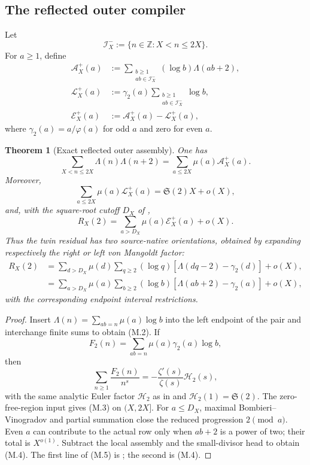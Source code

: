 \documentclass[11pt]{article}
\newtheorem{theorem}{Theorem}[section]
\theoremstyle{definition}
\theoremstyle{remark}
\newcommand{\Z}{\mathbb Z}
\begin{document}
\subsection{The reflected outer compiler}

Let
\[
 \mathscr I_X^-:=\{n\in\Z:X<n\le2X\}.
\]
For $a\ge1$, define
\[
 \begin{aligned}
 \mathcal A_X^+(a)
 &:=\sum_{\substack{b\ge1\\ab\in\mathscr I_X^-}}
       (\log b)\Lambda(ab+2),\\
 \mathcal L_X^+(a)
 &:=\gamma_2(a)
     \sum_{\substack{b\ge1\\ab\in\mathscr I_X^-}}\log b,\\
 \mathcal E_X^+(a)
 &:=\mathcal A_X^+(a)-\mathcal L_X^+(a),
 \end{aligned}
 \tag{M.1}
\]
where $\gamma_2(a)=a/\varphi(a)$ for odd $a$ and zero for even $a$.

\begin{theorem}[Exact reflected outer assembly]
\label{thm:hard-reflected-assembly}
One has
\[
 \boxed{
 \sum_{X<n\le2X}\Lambda(n)\Lambda(n+2)
 =\sum_{a\le2X}\mu(a)\mathcal A_X^+(a).}
 \tag{M.2}
\]
Moreover,
\[
 \boxed{
 \sum_{a\le2X}\mu(a)\mathcal L_X^+(a)
 =\mathfrak S(2)X+o(X),}
 \tag{M.3}
\]
and, with the square-root cutoff $D_X$ of ,
\[
 \boxed{
 R_X(2)=\sum_{a>D_X}\mu(a)\mathcal E_X^+(a)+o(X).}
 \tag{M.4}
\]
Thus the twin residual has two source-native orientations, obtained by
expanding respectively the right or left von Mangoldt factor:
\[
 \begin{aligned}
 R_X(2)
 &=\sum_{d>D_X}\mu(d)
   \sum_{q\ge2}(\log q)
   [\Lambda(dq-2)-\gamma_2(d)]+o(X),\\
 &=\sum_{a>D_X}\mu(a)
   \sum_{b\ge2}(\log b)
   [\Lambda(ab+2)-\gamma_2(a)]+o(X),
 \end{aligned}
 \tag{M.5}
\]
with the corresponding endpoint interval restrictions.
\end{theorem}

\begin{proof}
Insert
$\Lambda(n)=\sum_{ab=n}\mu(a)\log b$
into the left endpoint of the pair and interchange finite sums to obtain
\textup{(M.2)}.  If
\[
 F_2(n)=\sum_{ab=n}\mu(a)\gamma_2(a)\log b,
\]
then
\[
 \sum_{n\ge1}\frac{F_2(n)}{n^s}
 =-\frac{\zeta'(s)}{\zeta(s)}\mathscr H_2(s),
\]
with the same analytic Euler factor $\mathscr H_2$ as in
 and
$\mathscr H_2(1)=\mathfrak S(2)$.  The zero-free-region input gives
\textup{(M.3)} on $(X,2X]$.  For $a\le D_X$, maximal
Bombieri--Vinogradov and partial summation close the reduced progression
$2\pmod a$.  Even $a$ can contribute to the actual row only when $ab+2$ is
a power of two; their total is $X^{o(1)}$.  Subtract the local assembly and
the small-divisor head to obtain \textup{(M.4)}.  The first line of
\textup{(M.5)} is ; the second is
\textup{(M.4)}.
\end{proof}
\end{document}
